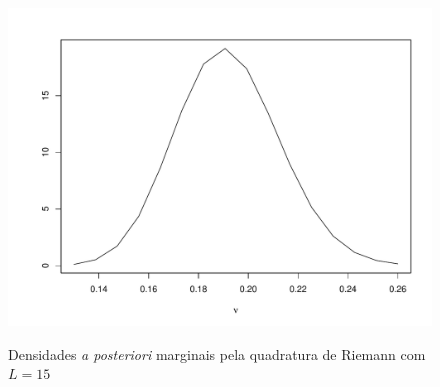 \documentclass[9pt]{beamer}
\begin{document}
\begin{frame}
\begin{figure}[t]
{{\includegraphics[scale=0.2]{figuras/dpm_nu_qr_15.pdf}}}%
\caption{Densidades \textit{a posteriori} marginais pela quadratura de Riemann com $L = 15$}%
\end{figure}
\end{frame}
\end{document}

